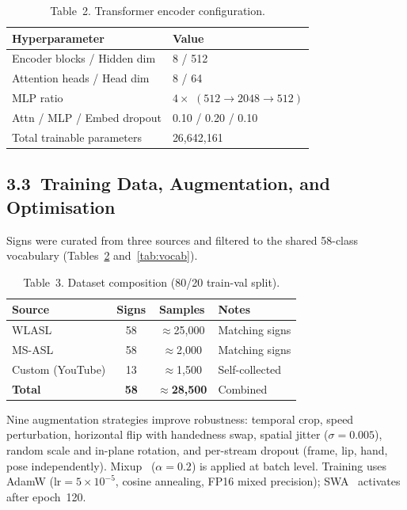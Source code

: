 \documentclass[10pt, twocolumn]{article}
\begin{document}
\begin{table}[h]
\centering
\caption{Table~2. Transformer encoder configuration.}
\label{tab:transformer}
\small
\begin{tabular}{|l|l|}
\hline
\textbf{Hyperparameter} & \textbf{Value} \\
\hline
Encoder blocks / Hidden dim & 8 / 512 \\
\hline
Attention heads / Head dim & 8 / 64 \\
\hline
MLP ratio & $4\times$ $(512{\to}2048{\to}512)$ \\
\hline
Attn / MLP / Embed dropout & 0.10 / 0.20 / 0.10 \\
\hline
Total trainable parameters & 26,642,161 \\
\hline
\end{tabular}
\end{table}

\subsection*{3.3~Training Data, Augmentation, and Optimisation}
Signs were curated from three sources and filtered to the shared 58-class vocabulary (Tables~\ref{tab:dataset} and~\ref{tab:vocab}).

\begin{table}[h]
\centering
\caption{Table~3. Dataset composition (80/20 train-val split).}
\label{tab:dataset}
\small
\setlength{\tabcolsep}{3pt}
\begin{tabular}{|l|c|c|p{1.8cm}|}
\hline
\textbf{Source} & \textbf{Signs} & \textbf{Samples} & \textbf{Notes} \\
\hline
WLASL~\cite{wlasl}    & 58 & $\approx$25,000 & Matching signs \\
\hline
MS-ASL~\cite{msasl}   & 58 & $\approx$2,000  & Matching signs \\
\hline
Custom (YouTube)       & 13 & $\approx$1,500  & Self-collected \\
\hline
\textbf{Total}         & \textbf{58} & $\approx$\textbf{28,500} & Combined \\
\hline
\end{tabular}
\end{table}

Nine augmentation strategies improve robustness: temporal crop, speed perturbation, horizontal flip with handedness swap, spatial jitter ($\sigma=0.005$), random scale and in-plane rotation, and per-stream dropout (frame, lip, hand, pose independently). Mixup~\cite{mixup} ($\alpha=0.2$) is applied at batch level. Training uses AdamW ($\text{lr}=5\times10^{-5}$, cosine annealing, FP16 mixed precision); SWA~\cite{swa} activates after epoch~120.
\end{document}
